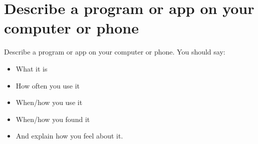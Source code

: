 \newpage

\section{Describe a program or app on your computer or phone}
\begin{ieltsprompt}
Describe a program or app on your computer or phone.
You should say:
\begin{itemize}[leftmargin=2em, itemsep=2pt]
\item What it is
\item How often you use it
\item When/how you use it
\item When/how you found it
\item And explain how you feel about it.
\end{itemize}
\end{ieltsprompt}
